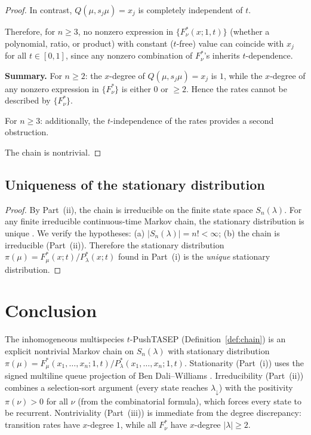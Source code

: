 \documentclass[12pt]{article}
\theoremstyle{definition}
\begin{document}
\begin{proof}
In contrast, $Q(\mu, s_j\mu) = x_j$ is completely independent of $t$.

Therefore, for $n \geq 3$, no nonzero expression in $\{F^*_\nu(x;1,t)\}$
(whether a polynomial, ratio, or product) with constant ($t$-free) value
can coincide with $x_j$ for all $t \in [0,1]$, since any nonzero
combination of $F^*_\nu$'s inherits $t$-dependence.

\medskip
\noindent\textbf{Summary.}
For $n \geq 2$: the $x$-degree of $Q(\mu, s_j\mu) = x_j$ is $1$,
while the $x$-degree of any nonzero expression in $\{F^*_\nu\}$
is either $0$ or $\geq 2$.  Hence the rates cannot be described by
$\{F^*_\nu\}$.

For $n \geq 3$: additionally, the $t$-independence of the rates provides
a second obstruction.

The chain is nontrivial.
\end{proof}

\subsection{Uniqueness of the stationary distribution}

\begin{proof}
By Part~(ii), the chain is irreducible on the finite state space
$S_n(\lambda)$.  For any finite irreducible continuous-time Markov chain,
the stationary distribution is unique \cite[Thm.~3.5.3]{Norris97}.
We verify the hypotheses: (a) $|S_n(\lambda)| = n! < \infty$; (b) the
chain is irreducible (Part~(ii)).  Therefore the stationary distribution
$\pi(\mu) = F^*_\mu(x;t) / P^*_\lambda(x;t)$ found in Part~(i) is the
\emph{unique} stationary distribution.
\end{proof}

\section{Conclusion}

The inhomogeneous multispecies $t$-PushTASEP (Definition~\ref{def:chain})
is an explicit nontrivial Markov chain on $S_n(\lambda)$ with stationary
distribution $\pi(\mu) = F^*_\mu(x_1,\dots,x_n;1,t) / P^*_\lambda(x_1,
\dots,x_n;1,t)$.  Stationarity (Part~(i)) uses the signed multiline queue
projection of Ben Dali--Williams \cite{BDW25,BDW26}.  Irreducibility
(Part~(ii)) combines a selection-sort argument (every state reaches
$\lambda_\downarrow$) with the positivity $\pi(\nu) > 0$ for all $\nu$
(from the combinatorial formula), which forces every state to be recurrent.
Nontriviality (Part~(iii)) is immediate from the degree discrepancy:
transition rates have $x$-degree $1$, while all $F^*_\nu$ have
$x$-degree $|\lambda| \geq 2$.
\end{document}
